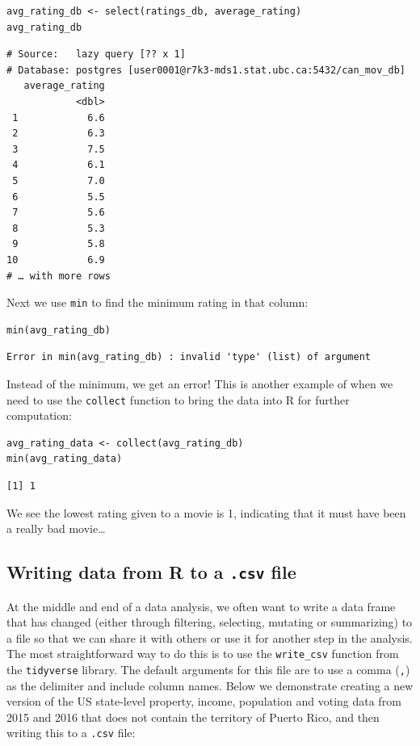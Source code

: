 \documentclass[
]{article}
\begin{document}
\begin{verbatim}
avg_rating_db <- select(ratings_db, average_rating)
avg_rating_db
\end{verbatim}

\begin{verbatim}
# Source:   lazy query [?? x 1]
# Database: postgres [user0001@r7k3-mds1.stat.ubc.ca:5432/can_mov_db]
   average_rating
            <dbl>
 1            6.6
 2            6.3
 3            7.5
 4            6.1
 5            7.0
 6            5.5
 7            5.6
 8            5.3
 9            5.8
10            6.9
# … with more rows
\end{verbatim}

Next we use \texttt{min} to find the minimum rating in that column:

\begin{verbatim}
min(avg_rating_db)
\end{verbatim}

\begin{verbatim}
Error in min(avg_rating_db) : invalid 'type' (list) of argument
\end{verbatim}

Instead of the minimum, we get an error! This is another example of when
we need to use the \texttt{collect} function to bring the data into R
for further computation:

\begin{verbatim}
avg_rating_data <- collect(avg_rating_db)
min(avg_rating_data)
\end{verbatim}

\begin{verbatim}
[1] 1
\end{verbatim}

We see the lowest rating given to a movie is 1, indicating that it must
have been a really bad movie\ldots{}

\hypertarget{writing-data-from-r-to-a-.csv-file}{%
\subsection{\texorpdfstring{Writing data from R to a \texttt{.csv}
file}{Writing data from R to a .csv file}}\label{writing-data-from-r-to-a-.csv-file}}

At the middle and end of a data analysis, we often want to write a data
frame that has changed (either through filtering, selecting, mutating or
summarizing) to a file so that we can share it with others or use it for
another step in the analysis. The most straightforward way to do this is
to use the \texttt{write\_csv} function from the \texttt{tidyverse}
library. The default arguments for this file are to use a comma
(\texttt{,}) as the delimiter and include column names. Below we
demonstrate creating a new version of the US state-level property,
income, population and voting data from 2015 and 2016 that does not
contain the territory of Puerto Rico, and then writing this to a
\texttt{.csv} file:
\end{document}
